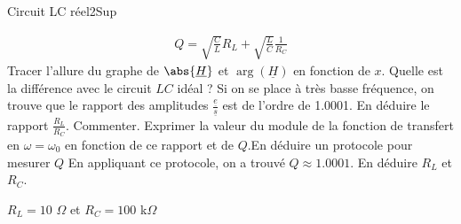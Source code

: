 \begin{exercise}{Circuit LC réel}{2}{Sup}
\begin{questions}
\begin{align*}
        Q = \sqrt{\frac{C}{L}}R_L + \sqrt{\frac{L}{C}}\frac{1}{R_C}
    \end{align*}
    \question Tracer l'allure du graphe de $\abs{\underline{H}}$ et $\arg(\underline{H})$ en fonction de $x$. Quelle est la différence avec le circuit $LC$ idéal ?
    \question Si on se place à très basse fréquence, on trouve que le rapport des amplitudes $\frac{\underline{e}}{\underline{s}}$ est de l'ordre de 1.0001. En déduire le rapport $\frac{R_L}{R_C}$. Commenter.
    \question Exprimer la valeur du module de la fonction de transfert en $\omega = \omega_0$ en fonction de ce rapport et de $Q$.En déduire un protocole pour mesurer $Q$
    \question En appliquant ce protocole, on a trouvé $Q \approx 1.0001$. En déduire $R_L$ et $R_C$.
\end{questions}
\end{exercise}


\begin{solution}

$R_L = 10$ $\Omega$ et $R_C = 100$ k$\Omega$

\end{solution}